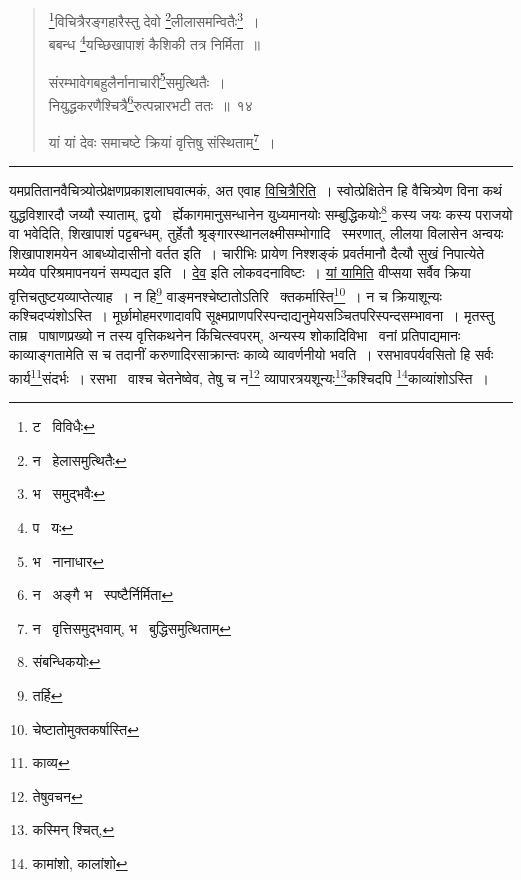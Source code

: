 \documentclass[11pt, openany]{book}
\begin{document}
\newpage

\begin{quote}
{\na \renewcommand{\thefootnote}{1}\footnote{ट \textendash\ विविधैः}विचित्रैरङ्गहारैस्तु देवो \renewcommand{\thefootnote}{2}\footnote{न \textendash\ हेलासमुत्थितैः}लीलासमन्वितैः\renewcommand{\thefootnote}{3}\footnote{भ \textendash\ समुद्भवैः}~।\\
बबन्ध \renewcommand{\thefootnote}{4}\footnote{प \textendash\ यः}यच्छिखापाशं कैशिकी तत्र निर्मिता~॥

संरम्भावेगबहुलैर्नानाचारी\renewcommand{\thefootnote}{5}\footnote{भ \textendash\ नानाधार}समुत्थितैः~।\\
नियुद्धकरणैश्चित्रै\renewcommand{\thefootnote}{6}\footnote{न \textendash\ अङ्गै भ \textendash\ स्पष्टैर्निर्मिता}रुत्पन्नारभटी ततः~॥~१४

यां यां देवः समाचष्टे क्रियां वृत्तिषु संस्थिताम्\renewcommand{\thefootnote}{7}\footnote{न \textendash\ वृत्तिसमुद्भवाम्, भ \textendash\ बुद्धिसमुत्थिताम्}~।}
\end{quote}

\hrule

\vspace{2mm}
\noindent
यमप्रतितानवैचित्र्योत्प्रेक्षणप्रकाशलाघवात्मकं, अत एवाह \underline{विचित्रैरिति}~। स्वोत्प्रेक्षितेन हि वैचित्र्येण विना कथं युद्धविशारदौ जय्यौ स्याताम्, द्वयो \textendash\ र्ह्येकागमानुसन्धानेन युध्यमानयोः सम्बुद्धिकयोः\renewcommand{\thefootnote}{1}\footnote{संबन्धिकयोः} कस्य जयः कस्य पराजयो वा भवेदिति, शिखापाशं पट्टबन्धम्, तुर्हेतौ श्रृङ्गारस्थानलक्ष्मीसम्भोगादि \textendash\ स्मरणात्, लीलया विलासेन अन्वयः शिखापाशमयेन आबध्योदासीनो वर्तत इति~। चारीभिः प्रायेण निश्शङ्कं प्रवर्तमानौ दैत्यौ सुखं निपात्येते मय्येव परिश्रमापनयनं सम्पद्यत इति~। \underline{देव} इति लोकवदनाविष्टः~। \underline{यां यामिति} वीप्सया सर्वैव क्रिया वृत्तिचतुष्टयव्याप्तेत्याह~। न हि\renewcommand{\thefootnote}{2}\footnote{तर्हि} वाङ्मनश्चेष्टातोऽतिरि \textendash\ क्तकर्मास्ति\renewcommand{\thefootnote}{3}\footnote{चेष्टातोमुक्तकर्षास्ति}~। न च क्रियाशून्यः कश्चिदप्यंशोऽस्ति~। मूर्छामोहमरणादावपि सूक्ष्मप्राणपरिस्पन्दाद्यनुमेयसञ्चितपरिस्पन्दसम्भावना~। मृतस्तु ताम्र \textendash\ पाषाणप्रख्यो न तस्य वृत्तिकथनेन किंचित्स्वपरम्, अन्यस्य शोकादिविभा \textendash\ वनां प्रतिपाद्यमानः काव्याङ्गतामेति स च तदानीं करुणादिरसाक्रान्तः काव्ये व्यावर्णनीयो भवति~। रसभावपर्यवसितो हि सर्वः कार्य\renewcommand{\thefootnote}{4}\footnote{काव्य}संदर्भः~। रसभा \textendash\ वाश्च चेतनेष्वेव, तेषु च न\renewcommand{\thefootnote}{5}\footnote{तेषुवचन} व्यापारत्रयशून्यः\renewcommand{\thefootnote}{6}\footnote{कस्मिन् श्चित्,}कश्चिदपि \renewcommand{\thefootnote}{7}\footnote{कामांशो, कालांशो}काव्यांशोऽस्ति~।
\end{document}
